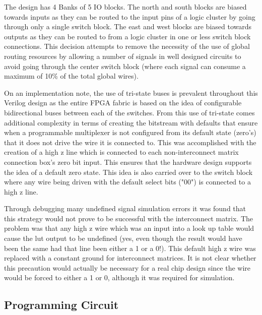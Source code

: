 \documentclass[12pt]{article}
\begin{document}
The design has 4 Banks of 5 IO blocks. The north and south blocks are biased towards inputs
as they can be routed to the input pins of a logic cluster by going through only a single switch
block. The east and west blocks are biased towards outputs as they can be routed to from a logic
cluster in one or less switch block connections. This decision attempts to remove the necessity 
of the use of global routing resources by allowing a number of signals
in well designed circuits to avoid going through the center switch block (where each signal can
consume a maximum of 10\% of the total global wires).

On an implementation note, the use of tri-state buses is prevalent throughout this Verilog
design as the entire FPGA fabric is based on the idea of configurable bidirectional buses
between each of the switches. From this use of tri-state comes additional complexity in
terms of creating the bitstream with defaults that ensure when a programmable multiplexer is not configured
from its default state (zero's) that it does not drive the wire it is connected to.
This was accomplished with the creation of a high z line which is connected to each non-interconnect
matrix connection box's zero bit input. This ensures that the hardware design supports the idea
of a default zero state. This idea is also carried over to the switch block where any wire
being driven with the default select bits ("00") is connected to a high z line.

Through debugging many undefined signal simulation errors it was found that this strategy
would not prove to be successful with the interconnect matrix. The problem was that any high z
wire which was an input into a look up table would cause the lut output to be undefined (yes,
even though the result would have been the same had that line been either a 1 or a 0!).
This default high z wire was replaced with a constant ground for interconnect matrices.
It is not clear whether this precaution would actually be necessary for a real chip design
since the wire would be forced to either a 1 or 0, although it was required for simulation.

\subsection{Programming Circuit}
\end{document}
